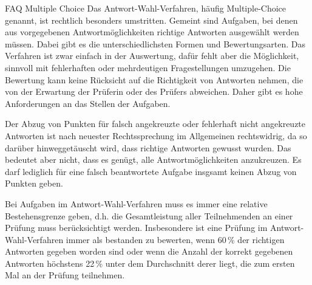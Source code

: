 \begin{artikel}{FAQ Multiple Choice}
Das Antwort-Wahl-Verfahren, häufig Multiple-Choice genannt, ist rechtlich besonders umstritten. Gemeint sind Aufgaben, bei denen aus vorgegebenen Antwortmöglichkeiten richtige Antworten ausgewählt werden müssen. Dabei gibt es die unterschiedlichsten Formen und Bewertungsarten. Das Verfahren ist zwar einfach in der Auswertung, dafür fehlt aber die Möglichkeit, sinnvoll mit fehlerhaften oder mehrdeutigen Fragestellungen umzugehen. Die Bewertung kann keine Rücksicht auf die Richtigkeit von Antworten nehmen, die von der Erwartung der Prüferin oder des Prüfers abweichen. Daher gibt es hohe Anforderungen an das Stellen der Aufgaben.


Der Abzug von Punkten für falsch angekreuzte oder fehlerhaft nicht angekreuzte Antworten ist nach neuester Rechtssprechung im Allgemeinen rechtswidrig, da so darüber hinweggetäuscht wird, dass richtige Antworten gewusst wurden. Das bedeutet aber nicht, dass es genügt, alle Antwortmöglichkeiten anzukreuzen. Es darf lediglich für eine falsch beantwortete Aufgabe insgsamt keinen Abzug von Punkten geben.

Bei Aufgaben im Antwort-Wahl-Verfahren muss es immer eine relative Bestehensgrenze geben, d.h. die Gesamtleistung aller Teilnehmenden an einer Prüfung muss berücksichtigt werden. Insbesondere ist eine Prüfung im Antwort-Wahl-Verfahren immer als bestanden zu bewerten, wenn 60\,\% der richtigen Antworten gegeben worden sind oder wenn die Anzahl der korrekt gegebenen Antworten höchstens 22\,\% unter dem Durchschnitt derer liegt, die zum ersten Mal an der Prüfung teilnehmen.
\end{artikel}
